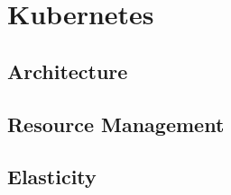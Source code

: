 \chapter{Kubernetes}
\label{chp:kubernetes}


\lipsum[1]


\section{Architecture}
\label{sec:kubernetes-architecture}

\lipsum[1]


\section{Resource Management}
\label{sec:kubernetes-resource-management}

\lipsum[1]


\section{Elasticity}
\label{sec:kubernetes-elasticity}

\lipsum[1]